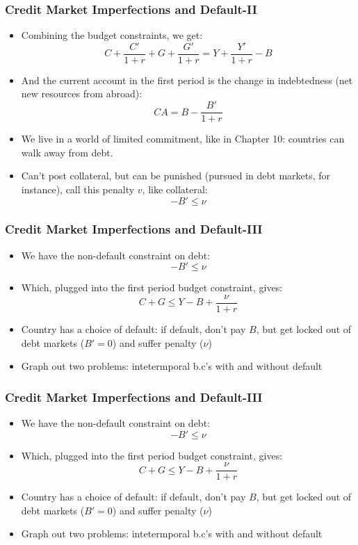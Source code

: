 \documentclass{beamer}
\begin{document}
\begin{frame}
\frametitle[alignment=center]{Credit Market Imperfections and Default-II}
\begin{itemize}
\item Combining the budget constraints, we get:
$$C+\frac{C'}{1+r}+G+\frac{G'}{1+r}=Y+\frac{Y'}{1+r}-B$$
\item And the current account in the first period is the change in indebtedness (net new resources from abroad):
$$CA=B-\frac{B'}{1+r}$$
\bigskip
\item We live in a world of limited commitment, like in Chapter 10:  countries can walk away from debt.
\bigskip
\item Can't post collateral, but can be punished (pursued in debt markets, for instance), call this penalty $v$, like collateral:
$$-B'\leq \nu$$
\end{itemize}
\end{frame}

\begin{frame}
\frametitle[alignment=center]{Credit Market Imperfections and Default-III}
\begin{itemize}
\item We have the non-default constraint on debt:
$$-B'\leq \nu$$
\item Which, plugged into the first period budget constraint, gives:
$$C+G\leq Y-B+\frac{\nu}{1+r}$$
\item Country has a choice of default:  if default, don't pay $B$, but get locked out of debt markets ($B'=0$) and suffer penalty ($\nu$)
\bigskip
\item Graph out two problems: intetermporal b.c's with and without default
\end{itemize}
\end{frame}

\begin{frame}
\frametitle[alignment=center]{Credit Market Imperfections and Default-III}
\begin{itemize}
\item We have the non-default constraint on debt:
$$-B'\leq \nu$$
\item Which, plugged into the first period budget constraint, gives:
$$C+G\leq Y-B+\frac{\nu}{1+r}$$
\item Country has a choice of default:  if default, don't pay $B$, but get locked out of debt markets ($B'=0$) and suffer penalty ($\nu$)
\bigskip
\item Graph out two problems: intetermporal b.c's with and without default
\end{itemize}
\end{frame}
\end{document}
